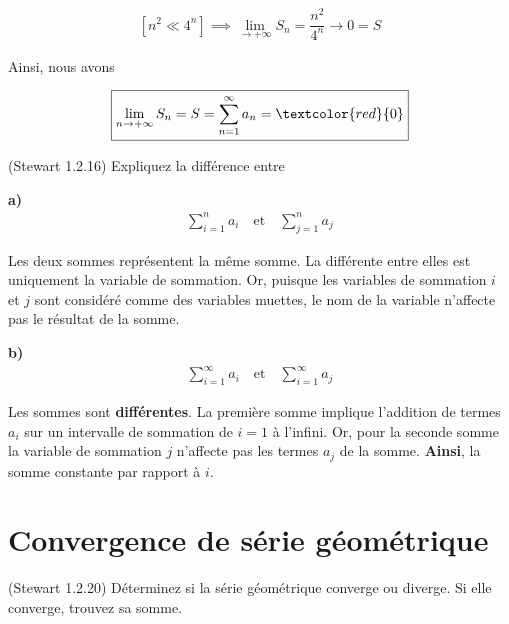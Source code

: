 \documentclass{report}
\begin{document}
    \begin{align*}
        \left[ n^2 \ll 4^n \right] \implies 
        \lim\limits_{ \to+\infty }S_n = \dfrac{n^2}{4^n} \longrightarrow 0 = S 
    \end{align*}

    Ainsi, nous avons 

    \begin{align*}
        \boxed{
            \lim\limits_{n \to+\infty }S_n = S = \sum_{n=1}^{\infty }a_n = 
            \textcolor{red}{0} 
        }
    \end{align*}


    \begin{Exercice}{(Stewart 1.2.16)}{}
        Expliquez la différence entre
    \end{Exercice}

    \noindent
    \textbf{a)} 
    \begin{align*}    
        \sum_{i=1}^{n}a_i \quad 
        \text{et} \quad%
        \sum_{j=1}^{n}a_j
    \end{align*}

    Les deux sommes représentent la même somme. La différente entre elles 
    est uniquement la variable de sommation. Or, puisque les variables de 
    sommation $i$ et $j$ sont considéré comme des variables muettes, le nom 
    de la variable n'affecte pas le résultat de la somme. 



    \vspace{1em}
    \textbf{b)}
    \begin{align*}
        \sum_{i=1}^{\infty }a_i 
        \quad%
        \text{et}
        \quad%
        \sum_{i=1}^{\infty }a_j
    \end{align*}

    Les sommes sont \textbf{différentes}. La première somme implique l'addition de termes 
    $a_i$ sur un intervalle de sommation de $i = 1$ à l'infini. Or, pour la seconde 
    somme la variable de sommation $j$ n'affecte pas les termes $a_j$ de la somme. 
    \textbf{Ainsi}, la somme constante par rapport à $i$.   


    \section{Convergence de série géométrique}
    \begin{Exercice}{(Stewart 1.2.20)}{}
        Déterminez si la série géométrique converge ou diverge. Si elle converge, 
        trouvez sa somme. 
    \end{Exercice}
\end{document}
